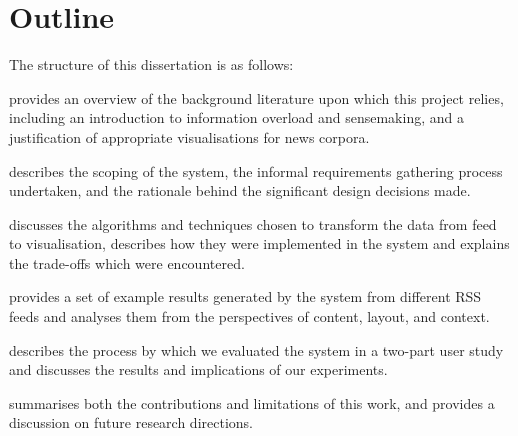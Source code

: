 \section*{Outline}
The structure of this dissertation is as follows: \vspace{-0.1cm}
\begin{description}[leftmargin=5.58em,style=nextline]
	\item [Chapter \ref{c:litreview}] provides an overview of the background literature upon which this project relies, including an introduction to information overload and sensemaking, and a justification of appropriate visualisations for news corpora.
	\item [Chapter \ref{c:reqs}] describes the scoping of the system, the informal requirements gathering process undertaken, and the rationale behind the significant design decisions made.
	\item [Chapter \ref{c:implementation}] discusses the algorithms and techniques chosen to transform the data from feed to visualisation, describes how they were implemented in the system and explains the trade-offs which were encountered.
	\item [Chapter \ref{c:results}] provides a set of example results generated by the system from different RSS feeds and analyses them from the perspectives of content, layout, and context.
	\item [Chapter \ref{c:evaluation}] describes the process by which we evaluated the system in a two-part user study and discusses the results and implications of our experiments.
	\item [Chapter \ref{c:conclusions}] summarises both the contributions and limitations of this work, and provides a discussion on future research directions.
\end{description}

